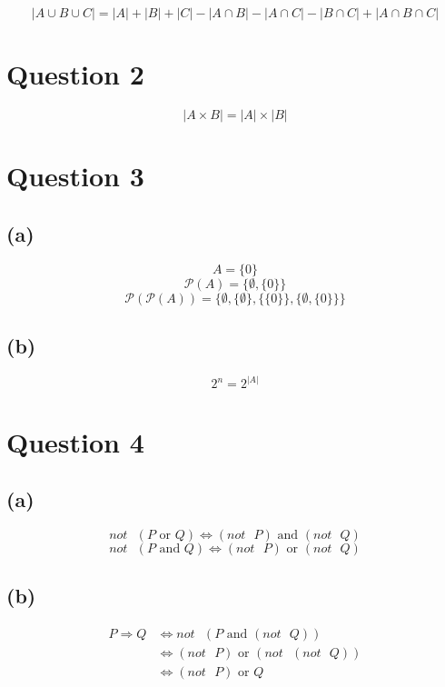 \documentclass[11pt]{article}
\begin{document}
\[|A \cup B \cup C| = |A| + |B| + |C| - |A \cap B| - |A \cap C| - |B \cap C| + |A \cap B \cap C| \]


\section{Question 2}
\label{sec:org4c2cf06}

\[|A \times B| = |A| \times |B|\]


\section{Question 3}
\label{sec:orgd35cc53}

\subsection{(a)}
\label{sec:orgfe3d578}

\[A = \{0\}\]
\[\mathcal{P}(A) = \{ \emptyset, \{0\} \}\]
\[\mathcal{P}(\mathcal{P}(A)) = \{ \emptyset, \{\emptyset\}, \{ \{0\} \}, \{ \emptyset, \{0\} \} \}\]


\subsection{(b)}
\label{sec:org53d150d}

\[2^n = 2^{|A|}\]


\section{Question 4}
\label{sec:org07c11c4}

\subsection{(a)}
\label{sec:org86c1bab}

\[not \text{ } (P \text{ or } Q) \Leftrightarrow (not \text{ } P) \text{ and } (not \text{ } Q)\]
\[not \text{ } (P \text{ and } Q) \Leftrightarrow (not \text{ } P) \text{ or } (not \text{ } Q)\]


\subsection{(b)}
\label{sec:org685c8d5}

\begin{align*}
P \Rightarrow Q &\Leftrightarrow not \text{ } (P \text{ and } (not \text{ } Q)) \\
&\Leftrightarrow (not \text{ } P) \text{ or } (not \text{ } (not \text{ } Q)) \\
&\Leftrightarrow (not \text{ } P) \text{ or } Q
\end{align*}
\end{document}
